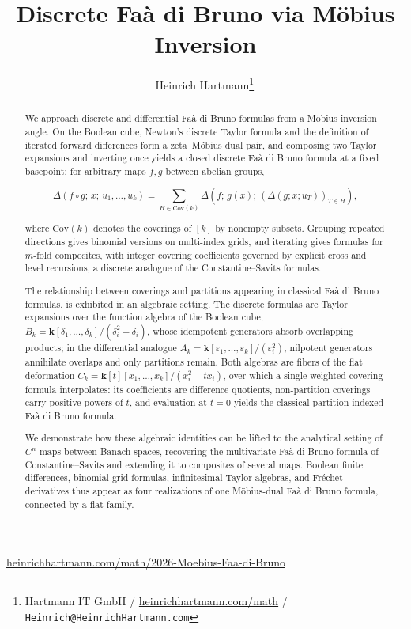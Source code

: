 \documentclass[10pt,a4paper]{article}
\title{Discrete Faà di Bruno via Möbius Inversion}
\author{Heinrich Hartmann\footnote{Hartmann IT GmbH / \href{https://heinrichhartmann.com/math}{heinrichhartmann.com/math} / \texttt{Heinrich@HeinrichHartmann.com}}\;\,\orcidlink{0000-0002-3929-2421}}
\date{}
\theoremstyle{plain}
\theoremstyle{definition}
\newcommand{\1}{\mathbb{1}} %
\begin{document}
\maketitle
\vspace{-3em}\begin{center}\href{https://heinrichhartmann.com/math/2026-Moebius-Faa-di-Bruno}{heinrichhartmann.com/math/2026-Moebius-Faa-di-Bruno}\end{center}\vspace{0.5em}

\begin{abstract}
We approach discrete and differential Faà di Bruno formulas from a Möbius inversion angle. 
On the Boolean cube, Newton's discrete Taylor formula and the definition of iterated forward differences form a zeta--Möbius dual pair, 
and composing two Taylor expansions and inverting once yields a closed discrete 
Faà di Bruno formula at a fixed basepoint: for arbitrary maps $f, g$ between abelian groups,

$$
\Delta(f \circ g;\,x;\,u_1,\dots,u_k) = \sum_{H \in \mathrm{Cov}(k)} \Delta(f;\,g(x);\,(\Delta(g;x;u_T))_{T\in H}),
$$

where $\mathrm{Cov}(k)$ denotes the coverings of $[k]$ by nonempty subsets.
Grouping repeated directions gives binomial versions on multi-index grids, and iterating gives formulas for $m$-fold composites, 
with integer covering coefficients governed by explicit cross and level recursions, a discrete analogue of the Constantine--Savits formulas.

The relationship between coverings and partitions appearing in classical Faà di Bruno formulas, is exhibited in an algebraic setting. 
The discrete formulas are Taylor expansions over the function algebra of the Boolean cube, 
$B_k = \mathbf{k}[\delta_1,\dots,\delta_k]/(\delta_i^2-\delta_i)$, whose idempotent generators absorb overlapping products; 
in the differential analogue $A_k = \mathbf{k}[\varepsilon_1,\dots,\varepsilon_k]/(\varepsilon_i^2)$, nilpotent generators annihilate overlaps and only partitions remain. 
Both algebras are fibers of the flat deformation $C_k = \mathbf{k}[t][x_1,\dots,x_k]/(x_i^2 - tx_i)$, over which a single weighted covering formula interpolates: 
its coefficients are difference quotients, non-partition coverings carry positive powers of $t$, and evaluation at $t = 0$ yields 
the classical partition-indexed Faà di Bruno formula.

We demonstrate how these algebraic identities can be lifted to the analytical setting of $C^n$ maps between Banach spaces,
recovering the multivariate Faà di Bruno formula of Constantine--Savits and extending it to composites of several maps. 
Boolean finite differences, binomial grid formulas, infinitesimal Taylor algebras, and Fréchet derivatives thus appear 
as four realizations of one Möbius-dual Faà di Bruno formula, connected by a flat family.
\end{abstract}
\end{document}
